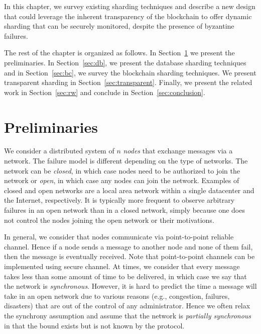 \documentclass[11pt,dvipdfm]{article}
\newcommand{\vincent}[1]{\emph{Vincent: #1}}%
\newcommand{\deepal}[1]{\emph{Deepal: #1}}%
\begin{document}

In this chapter, we survey existing sharding techniques and 
describe a new design that 
could leverage the inherent transparency of the blockchain to offer dynamic sharding that can be securely monitored, despite the presence
of byzantine failures.

The rest of the chapter is organized as follows.
In Section~\ref{sec:preliminaries} we present the preliminaries. In Section~\ref{sec:db}, we present the database sharding techniques and 
in Section~\ref{sec:bc}, we survey the blockchain sharding techniques. We present transparent sharding in Section~\ref{sec:transparent}. Finally, we present the related work in Section~\ref{sec:rw} and conclude in Section~\ref{sec:conclusion}.

\section{Preliminaries}\label{sec:preliminaries}


We consider a distributed system of $n$ \emph{nodes} that exchange messages via a network.  
The failure model is different depending on the type of networks.
The network can be \emph{closed}, in which case nodes need to be authorized to join the network or \emph{open}, in which case any nodes can join the network. Examples of closed and open networks are a local area network within a single datacenter and the Internet, respectively.
It is typically more frequent to observe arbitrary failures in an open network than in a closed network, simply because one does not control the nodes joining the open network or their motivations.

In general, we consider that nodes communicate via point-to-point reliable channel. Hence if a node sends a message
to another node and none of them fail, then the message is eventually received. Note that point-to-point channels can be implemented using secure channel.
At times, we consider that every message takes less than some amount of time to be delivered, in which case we say that the network is \emph{synchronous}.
However, it is hard to predict the time a message will take in an open network due to various reasons (e.g., congestion, failures, disasters) that are out of the control of any administrator. Hence we often relax the synchrony assumption and assume that the network is \emph{partially synchronous}~\cite{DLS88} in that the bound exists but is not known by the protocol.
\end{document}

